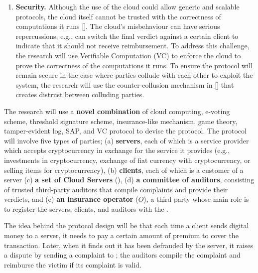 \begin{enumerate}[leftmargin=5mm]
 \item \textbf{Security.} Although the use of the cloud could allow generic and scalable protocols, the cloud itself cannot be trusted with the correctness of computations it runs \href{https://stax.strath.ac.uk/concern/theses/qr46r085k}{[\printcntr]}. The cloud's misbehaviour can have serious repercussions, e.g., can switch the final verdict against a certain client to indicate that it should not receive reimbursement. To address this challenge, the research will use Verifiable Computation (VC) to enforce the cloud to prove the correctness of the computations it runs. To ensure the protocol will remain secure in the case where parties collude with each other to exploit the system, the research will use the counter-collusion mechanism in \href{https://dl.acm.org/doi/10.1145/3133956.3134032}{[\printcntr]} that creates distrust between colluding parties. 
\end{enumerate}

The research will use a \textbf{novel combination} of cloud computing, e-voting scheme, threshold signature scheme, insurance-like mechanism, game theory, tamper-evident log, SAP, and VC protocol to devise the protocol. 
%
The protocol will involve five types of parties; (a) \textbf{servers}, each of which is a service provider which accepts cryptocurrency in exchange for the service it provides (e.g., investments in cryptocurrency,  exchange of fiat currency with cryptocurrency, or selling items for cryptocurrency), (b) \textbf{clients}, each of which is a customer of a server (c) \textbf{a set of Cloud Servers} (\cs), (d) \textbf{a committee of auditors}, consisting of trusted third-party auditors that compile complaints and provide their verdicts, and (e) \textbf{an insurance operator} ($O$), a third party whose main role is to register the servers, clients, and auditors with the \cs. 

The idea behind the protocol design will be that each time a client sends digital money to a server, it needs to pay a certain amount of premium to cover the transaction. Later, when it finds out it has been defrauded by the server, it raises a dispute by sending a complaint to \cs; the auditors compile the complaint and reimburse the victim if its complaint is valid.





%



